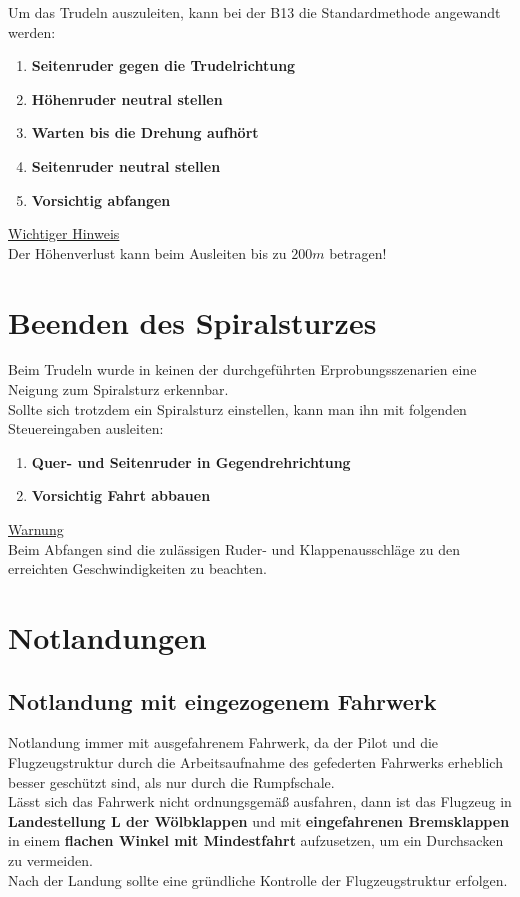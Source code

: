 Um das Trudeln auszuleiten, kann bei der B13 die Standardmethode angewandt werden:

\begin{enumerate}
\item \textbf{Seitenruder gegen die Trudelrichtung}
\item \textbf{Höhenruder neutral stellen}
\item \textbf{Warten bis die Drehung aufhört}
\item \textbf{Seitenruder neutral stellen}
\item \textbf{Vorsichtig abfangen}

\end{enumerate}



\underline{Wichtiger Hinweis}\\
Der Höhenverlust kann beim Ausleiten bis zu $200m$ betragen!


\section{Beenden des Spiralsturzes}
Beim Trudeln wurde in keinen der durchgeführten Erprobungsszenarien eine Neigung zum Spiralsturz erkennbar.\\
Sollte sich trotzdem ein Spiralsturz einstellen, kann man ihn mit folgenden Steuereingaben ausleiten:
\begin{enumerate}
\item \textbf{Quer- und Seitenruder in Gegendrehrichtung}
\item \textbf{Vorsichtig Fahrt abbauen}
\end{enumerate}


\underline{Warnung}\\
Beim Abfangen sind die zulässigen Ruder- und Klappenausschläge zu den erreichten Geschwindigkeiten zu beachten.


\section{Notlandungen}
\subsection{Notlandung mit eingezogenem Fahrwerk}
Notlandung immer mit ausgefahrenem Fahrwerk, da der Pilot und die Flugzeugstruktur durch die Arbeitsaufnahme des gefederten Fahrwerks erheblich besser geschützt sind, als nur durch die Rumpfschale.\\
\newline
Lässt sich das Fahrwerk nicht ordnungsgemäß ausfahren, dann ist das Flugzeug in \textbf{Landestellung L der Wölbklappen} und mit \textbf{eingefahrenen Bremsklappen} in einem \textbf{flachen Winkel mit Mindestfahrt} aufzusetzen, um ein Durchsacken zu vermeiden.\\
Nach der Landung sollte eine gründliche Kontrolle der Flugzeugstruktur erfolgen.

